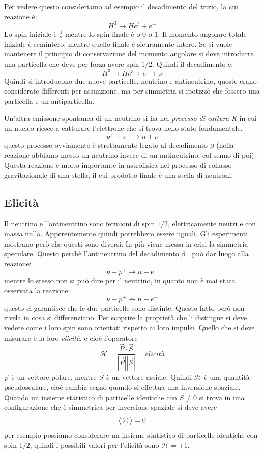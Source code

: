 Per vedere questo consideriamo ad esempio il decadimento del trizio, la cui 
reazione è:
\[
H^3\rightarrow He^3+e^-
\]
Lo spin iniziale è $\frac{1}{2}$ mentre lo spin finale è o $0$ o $1$. Il 
momento angolare totale iniziale è semintero, mentre quello finale è 
sicuramente intero.
Se si vuole mantenere il principio di conservazione del momento angolare si 
deve introdurre una particella che deve per forza avere spin $1/2$.
Quindi il decadimento è:
\[
H^3\rightarrow He^3+e^-+\nu
\]
Quindi si introducono due nuove particelle, neutrino e antineutrino, queste 
erano considerate differenti per assunzione, ma per simmetria si ipotizzò
che fossero una particella e un antiparticella.

Un'altra emissone spontanea di un neutrino si ha nel \textit{processo di 
cattura K} in cui un nucleo riesce a catturare l'elettrone che si trova nello 
stato fondamentale.
\[
p^++e^-\rightarrow n+\nu
\]
questo processo ovviamente è strettamente legato al decadimento $\beta$ (nella 
reazione abbiamo messo un neutrino invece di un antineutrino, col senno di poi).
Questa reazione è molto importante in astrofisica nel processo di collasso 
gravitazionale di una stella, il cui prodotto finale è una stella di neutroni.
\subsection{Elicità}
Il neutrino e l'antineutrino sono fermioni di spin $1/2$, elettricamente neutri 
e con massa nulla. Apperentemente quindi potrebbero essere uguali.
Gli esperimenti mostrano però che questi sono diversi. In più viene messa in 
crisi la simmetria speculare. Questo perchè l'antineutrino del decadimento 
$\beta^-$
può dar luogo alla reazione:
\[
\bar{\nu}+p^+\rightarrow n+e^+
\]
mentre lo stesso non si può dire per il neutrino, in quanto non è mai stata 
osservata la reazione:
\[
 \nu+p^+\nrightarrow n+e^+
\]
questo ci garantisce che le due particelle sono distinte. Questo fatto però 
non rivela in cosa si differenziano.
Per scoprire la proprietà che li distingue si deve vedere come i loro spin 
sono orientati rispetto ai loro impulsi.
Quello che si deve misurare è la loro \textit{elicità}, e cioè l'operatore
\[
\mathcal{H}=\frac{\vec{P}\cdot\vec{S}}{|\vec{P}||\vec{S}|}=\textit{elicità}
\]
$\vec{p}$ è un vettore polare, mentre $\vec{S}$ è un vettore assiale. Quindi 
$\mathcal{H}$ è una quantità pseudoscalare, cioè cambia segno quando si
effettua una inversione spaziale. Quando un insieme statistico di particelle 
identiche con $S\neq0$ si trova in una configurazione che è simmetrica per
inversione spaziale si deve avere
\[
  \left\langle\, \mathcal{H} \,\right\rangle=0
\]
per esempio possiamo considerare un insieme statistico di particelle identiche 
con spin $1/2$, quindi i possibili valori per l'elicità sono 
$\mathcal{H}=\pm1$.

